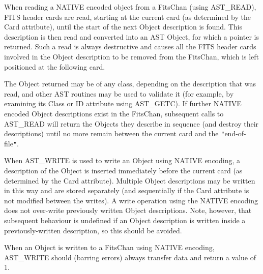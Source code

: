 \documentclass[twoside,11pt]{article}
\newcommand{\htmlref}[2]{#1}
\begin{document}
{{      When reading a NATIVE encoded object from a FitsChan (using
      AST\_READ), FITS header cards are read, starting at the current
      card (as determined by the Card attribute), until the start of
      the next Object description is found. This description is then
      read and converted into an AST Object, for which a pointer is
      returned. Such a read is always destructive and causes all the
      FITS header cards involved in the Object description to be
      removed from the FitsChan, which is left positioned at the
      following card.

      The Object returned may be of any class, depending on the
      description that was read, and other AST routines may be used to
      validate it (for example, by examining its \htmlref{Class}{Class} or \htmlref{ID}{ID} attribute
      using AST\_GETC). If further NATIVE encoded Object descriptions
      exist in the FitsChan, subsequent calls to AST\_READ will return
      the Objects they describe in sequence (and destroy their
      descriptions) until no more remain between the current card and
      the {\tt{"}}end-of-file{\tt{"}}.

      When AST\_WRITE is used to write an Object using NATIVE encoding,
      a description of the Object is inserted immediately before the
      current card (as determined by the Card attribute).  Multiple
      Object descriptions may be written in this way and are stored
      separately (and sequentially if the Card attribute is not
      modified between the writes). A write operation using the NATIVE
      encoding does not over-write previously written Object
      descriptions. Note, however, that subsequent behaviour is
      undefined if an Object description is written inside a
      previously-written description, so this should be avoided.

      When an Object is written to a FitsChan using NATIVE encoding,
      AST\_WRITE should (barring errors) always transfer data and
      return a value of 1.
   }
}
\end{document}
